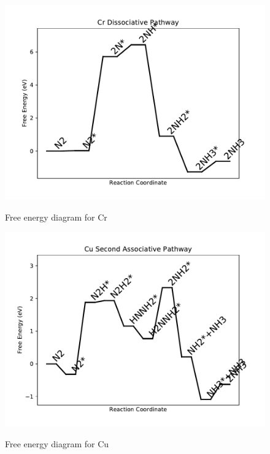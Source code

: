 \documentclass[journal=jacsat,manuscript=article]{achemso}
\begin{document}
\begin{figure}
\includegraphics[width=1\linewidth]{data/plots/Cr_dissociative.pdf}
\label{fig:Cr_dissociative}
\caption{Free energy diagram for Cr}
\end{figure}

\newpage
\begin{figure}
\includegraphics[width=1\linewidth]{data/plots/Cu_associative_2.pdf}
\label{fig:Cu_associative_2}
\caption{Free energy diagram for Cu}
\end{figure}
\end{document}
